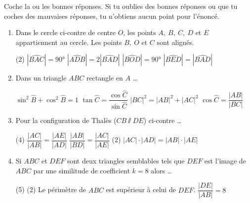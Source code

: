 %
%
    Coche la ou les bonnes réponses. Si tu oublies des bonnes réponses ou que tu coches des mauvaises réponses, tu n'obtiens aucun point pour l'énoncé.
    \begin{enumerate}
        \item \parbox[t]{.6\linewidth}{Dans le cercle ci-contre de centre $O$, les points $A,\ B,\ C,\ D$ et $E$ appartiennent au cercle. Les points $B,\ O$ et $C$ sont alignés.}
              \hfill
              
              \begin{QCM}(2)
                  \choice $|\widehat{BAC}|=\ang{90}$
                  \choice $|\widehat{ADB}| = 2|\widehat{BAD}|$
                  \choice $|\widehat{BOD}| = \ang{90}$
                  \choice $|\widehat{BED}| = |\widehat{BAD}|$
              \end{QCM}
        \item Dans un triangle $ABC$ rectangle en $A$ \dots
              \begin{QCM}
                  \choice $\sin^2\widehat{B} + \cos^2\widehat{B}=1$
                  \choice $\tan\widehat{C} = \dfrac{\cos\widehat{C}}{\sin\widehat{C}}$
                  \choice $|BC|^2 = |AB|^2 + |AC|^2$
                  \choice $\cos\widehat{C}=\dfrac{|AB|}{|BC|}$
              \end{QCM}
        \item Pour la configuration de Thalès ($CB\sslash DE$) ci-contre \dots 
              \begin{QCM}(4)
                  \choice $\dfrac{|AC|}{|AB|}=\dfrac{|AE|}{|AD|}$
                  \choice $\dfrac{|AB|}{|BD|}=\dfrac{|AC|}{|AE|}$
                  \choice*(2) $|AC|\cdot |AD| = |AB| \cdot |AE|$
              \end{QCM}
        \item Si $ABC$ et $DEF$ sont deux triangles semblables tels que $DEF$ est l'image de $ABC$ par une similitude de coefficient $k=8$ alors \dots
              \begin{QCM}(5)
                  \choice*(2) Le périmètre de $ABC$ est supérieur à celui de $DEF$.
                  \choice $\dfrac{|DE|}{|AB|}=8$

\end{QCM}
\end{enumerate}
